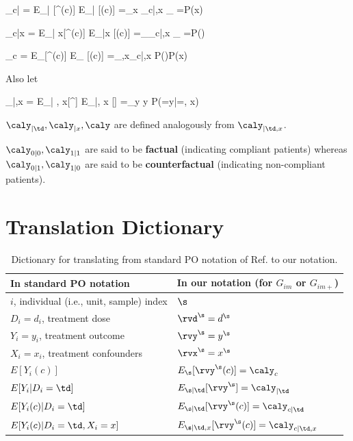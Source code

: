 \beq
\caly_{c|\td}
=
E_{\s| \td}[\rvy^\s(c)]
\rarrow
E_{\rvy|\td} [\rvy(c)]
=\sum_x \caly_{c|\td,x}
_
{=P(x)}
\eeq


\beq
\caly_{c|x}
=
E_{\s| x}[\rvy^\s(c)]
\rarrow
E_{\rvy|x} [\rvy(c)]
=\sum_\td \caly_{c|\td,x}
_
{=P(\td) }
\eeq

\beq
\caly_{c}
=
E_{\s}[\rvy^\s(c)]
\rarrow
E_{\rvy} [\rvy(c)]
=\sum_{\td,x}\caly_{c|\td,x}
 P(\td)P(x)
\eeq

Also let

\beq
\caly_{|\td,x}
=
E_{\s| \td, x}[\rvy^\s]
\rarrow
E_{\rvy|\td, x} [\rvy]
=\sum_y y P(\rvy=y|\rvtd=\td, x)
\eeq


$\caly_{|\td}, \caly_{|x}, \caly$ are 
defined analogously from 
$\caly_{|\td, x}$.

$\caly_{0|0}, \caly_{1|1}$
are said to be {\bf factual}
(indicating compliant patients)
whereas
$\caly_{0|1}, \caly_{1|0}$
are said to be {\bf counterfactual}
(indicating non-compliant patients).


\section{Translation Dictionary}

\begin{table}[h!]
\renewcommand{\arraystretch}{1.5}
\centering
\begin{tabular}{|l|l|}
\hline
\rowcolor[HTML]{ECF4FF}
In standard PO notation&
In our notation
(for $G_{im}$ or  $G_{im+}$)\\
\hline
$i$, individual (i.e., unit, sample) index& $\s$ \\
\hline
$D_i=d_i$, treatment dose & $\rvd^\s=d^\s$\\
\hline
$Y_i=y_i$, treatment outcome& $\rvy^\s=y^\s$ \\
\hline
$X_i=x_i$, treatment confounders& $\rvx^\s=x^\s$ \\
\hline
$E[Y_i(c)]$ &
$E_{\s}[\rvy^\s(c)]=\caly_{c}$ \\
\hline
$E[Y_i|D_i=\td]$ &
$ E_{\s|\td}[\rvy^\s]=\caly_{|\td}$\\
\hline
$E[Y_i(c)|D_i=\td]$ &
$E_{\s|\td}[\rvy^\s(c)]=\caly_{c|\td}$\\
\hline
$E[Y_i(c)|D_i=\td, X_i=x]$ &
$E_{\s|\td,x}[\rvy^\s(c)]=\caly_{c|\td,x}$\\
\hline
\end{tabular}
\caption{Dictionary for
translating
from standard PO notation
of Ref.\cite{book-mixtape} to our notation.
}
\label{tab-pot-out-dict}
\end{table}
\renewcommand{\arraystretch}{1}

